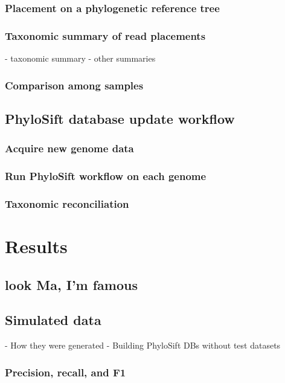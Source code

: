 \documentclass[10pt]{article}
\begin{document}
\subsubsection*{Placement on a phylogenetic reference tree}

\subsubsection*{Taxonomic summary of read placements}
      - taxonomic summary
      - other summaries
\subsubsection*{Comparison among samples}

\subsection*{PhyloSift database update workflow}
\subsubsection*{Acquire new genome data}
\subsubsection*{Run PhyloSift workflow on each genome}
\subsubsection*{Taxonomic reconciliation}

\section*{Results}


\subsection*{look Ma, I'm famous}

\subsection*{Simulated data}
    - How they were generated
    - Building PhyloSift DBs without test datasets
\subsubsection*{Precision, recall, and F1}
\end{document}
